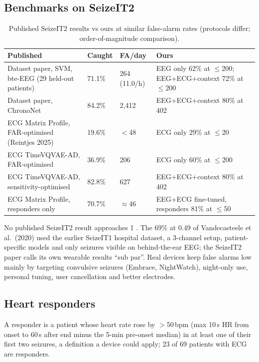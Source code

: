 \subsection{Benchmarks on SeizeIT2}

\begin{table}[H]
\centering\small
\caption{Published SeizeIT2 results vs ours at similar false-alarm rates (protocols differ; order-of-magnitude comparison).}
\begin{tabularx}{\linewidth}{@{}L l l L@{}}
\toprule
Published & Caught & FA/day & Ours \\
\midrule
Dataset paper, SVM, bte-EEG (29 held-out patients) & 71.1\% & 264 (11.0/h) & EEG only 62\% at $\le$200; EEG+ECG+context 72\% at $\le$200 \\
Dataset paper, ChronoNet & 84.2\% & 2,412 & EEG+ECG+context 80\% at 402 \\
ECG Matrix Profile, FAR-optimised (Reintjes 2025) & 19.6\% & $<$48 & ECG only 29\% at $\le$20 \\
ECG TimeVQVAE-AD, FAR-optimised & 36.9\% & 206 & ECG only 60\% at $\le$200 \\
ECG TimeVQVAE-AD, sensitivity-optimised & 82.8\% & 627 & EEG+ECG+context 80\% at 402 \\
ECG Matrix Profile, responders only & 70.7\% & $\approx$46 & EEG+ECG fine-tuned, responders 81\% at $\le$50 \\
\bottomrule
\end{tabularx}
\end{table}

No published SeizeIT2 result approaches 1 \FAd. The 69\% at 0.49 \FAd{} of Vandecasteele et al.\ (2020) used the earlier SeizeIT1 hospital dataset, a 3-channel setup, patient-specific models and only seizures visible on behind-the-ear EEG; the SeizeIT2 paper calls its own wearable results ``sub par''. Real devices keep false alarms low mainly by targeting convulsive seizures (Embrace, NightWatch), night-only use, personal tuning, user cancellation and better electrodes.

\subsection{Heart responders}

A responder is a patient whose heart rate rose by $>$50\,bpm (max 10\,s HR from onset to 60\,s after end minus the 5-min pre-onset median) in at least one of their first two seizures, a definition a device could apply; 23 of 69 patients with ECG are responders.

